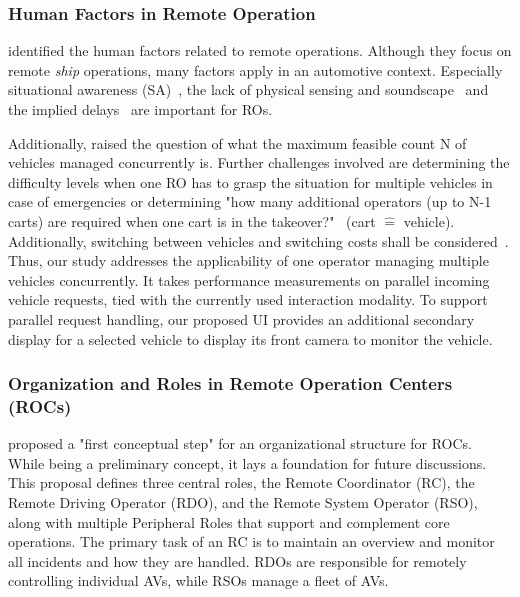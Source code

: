 \subsubsection{Human Factors in Remote Operation}
\citet{kari_human_2021} identified the human factors related to remote operations. Although they focus on remote \textit{ship} operations, many factors apply in an automotive context. Especially situational awareness (SA)~\cite{graf_improving_2020, gafert_teleoperationstation_2022, kettwich_teleoperation_2021, majstorovic_survey_2022}, the lack of physical sensing and soundscape~\cite{tener_driving_2022} and the implied delays~\cite{cummings_concepts_2020,tener_driving_2022,kang_augmenting_2018} are important for ROs. %

Additionally, \citet{hashimoto_human_2022} raised the question of what the maximum feasible count N of vehicles managed concurrently is. Further challenges involved are determining the difficulty levels when one RO has to grasp the situation for multiple vehicles in case of emergencies or determining "how many additional operators (up to N-1 carts) are required when one cart is in the takeover?"~\cite[p. 6]{hashimoto_human_2022} (cart $\widehat{=}$ vehicle).
Additionally, switching between vehicles and switching costs shall be considered~\cite{hashimoto_human_2022}. Thus, our study addresses the applicability of one operator managing multiple vehicles concurrently. It takes performance measurements on parallel incoming vehicle requests, tied with the currently used interaction modality. To support parallel request handling, our proposed UI provides an additional secondary display for a selected vehicle to display its front camera to monitor the vehicle.

\subsubsection{Organization and Roles in Remote Operation Centers (ROCs)}
\citet{schrank_roles_2021} proposed a "first conceptual step" for an organizational structure for ROCs. While being a preliminary concept, it lays a foundation for future discussions. This proposal defines three central roles, the Remote Coordinator (RC), the Remote Driving Operator (RDO), and the Remote System Operator (RSO), along with multiple Peripheral Roles that support and complement core operations. 
The primary task of an RC is to maintain an overview and monitor all incidents and how they are handled. RDOs are responsible for remotely controlling individual AVs, while RSOs manage a fleet of AVs. 

